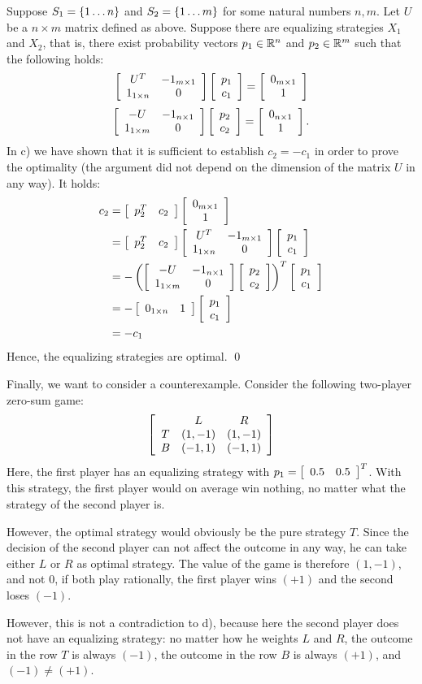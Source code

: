\documentclass{scrartcl}
\begin{document}
Suppose $S_1 = \set{1\dots n}$ and $S_2 = \set{1 \dots m}$ for some natural 
numbers $n,m$. Let $U$ be a $n\times m$ matrix defined as above.
Suppose there are equalizing strategies $X_1$ and $X_2$, that is, 
there exist probability vectors $p_1\in \Real^n$ and $p_2\in\Real^m$ such that
the following holds:
\[
  \mat{cc}{
    U^T & -1_{m\times 1} \\
    1_{1\times n} & 0
  }
  \mat{c}{p_1 \\ c_1} =
  \mat{c}{0_{m\times 1} \\ 1}
\]
\qquad
\[
  \mat{cc}{
    -U & -1_{n\times 1} \\
    1_{1\times m} & 0
  }
  \mat{c}{p_2 \\ c_2} =
  \mat{c}{0_{n\times 1} \\ 1}.
\]
In c) we have shown that it is sufficient to establish $c_2 = -c_1$ in order 
to prove the optimality (the argument did not depend on the dimension of
the matrix $U$ in any way). It holds:
\begin{align*}
c_2 &= \mat{cc}{p_2^T & c_2} \mat{c}{0_{m\times 1} \\ 1} \\
    &= \mat{cc}{p_2^T & c_2} \mat{cc}{
      U^T & -1_{m\times 1} \\ 1_{1\times n} & 0
    } \mat{c}{p_1 \\ c_1} \\
    &= -\rPar{
      \mat{cc}{-U & -1_{n\times 1} \\ 1_{1\times m} & 0}
      \mat{c}{p_2 \\ c_2}
    }^T \mat{c}{p_1 \\ c_1} \\
    &= - \mat{cc}{0_{1\times n} & 1} \mat{c}{p_1 \\ c_1} \\
    &= - c_1
\end{align*}
Hence, the equalizing strategies are optimal. \hfill \qed

 Finally, we want to consider a counterexample.
Consider the following two-player zero-sum game:
\[
  \mat{ccc}{
       & L        & R \\
     T & (1, -1)  & (1, -1) \\
     B & (-1, 1)  & (-1, 1)
  }
\]
Here, the first player has an equalizing strategy with 
$p_1 = \mat{cc}{0.5 & 0.5}^T$. With this strategy, 
the first player would on average win nothing, 
no matter what the strategy of the second player is.

However, the optimal strategy would obviously be the pure strategy $T$.
Since the decision of the second player can not affect the outcome in any way, 
he can take either $L$ or $R$ as optimal strategy. The value of the game is 
therefore $(1, -1)$, and not $0$, if both play rationally, the first player 
wins $(+1)$ and the second loses $(-1)$.

However, this is not a contradiction to d), because here the second player 
does not have an equalizing strategy: no matter how he weights $L$ and $R$, 
the outcome in the row $T$ is always $(-1)$, 
the outcome in the row $B$ is always $(+1)$, and $(-1) \neq (+1)$.
\end{document}
